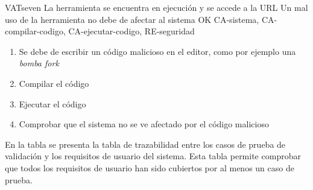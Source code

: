 \begin{testCase}{VAT}{seven}
    {La herramienta se encuentra en ejecución y se accede a la URL}
    {\NA}
    {Un mal uso de la herramienta no debe de afectar al sistema}
    {OK}
    {CA-sistema, CA-compilar-codigo, CA-ejecutar-codigo, RE-seguridad}
    \begin{enumerate}
        \item Se debe de escribir un código malicioso en el editor, como por ejemplo una \textit{bomba fork}
        \item Compilar el código
        \item Ejecutar el código
        \item Comprobar que el sistema no se ve afectado por el código malicioso        
    \end{enumerate}
\end{testCase}
    

En la tabla  se presenta la tabla de trazabilidad entre los casos de prueba de validación y los requisitos de usuario del sistema. Esta tabla permite comprobar que todos los requisitos de usuario han sido cubiertos por al menos un caso de prueba.
\FloatBarrier

\begin{landscape}
    \begin{table}[htb]
          {\traceabilityVATUR}
      \end{table}
    \end{landscape}
    
